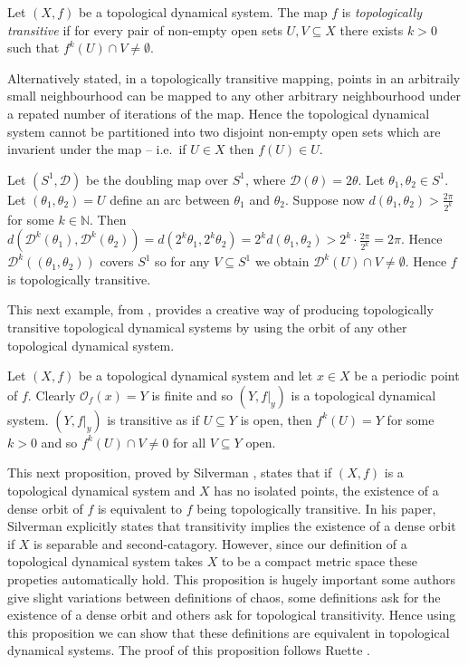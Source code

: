 \begin{defn} \label{defn:topological-transitivity}
    Let $(X, f)$ be a topological dynamical system. The map $f$ is \emph{topologically transitive} if for every pair of non-empty open sets $U, V \subseteq X$ there exists $k > 0$ such that $f^k(U) \cap V \neq \emptyset$.
\end{defn}

Alternatively stated, in a topologically transitive mapping, points in an arbitraily small neighbourhood can be mapped to any other arbitrary neighbourhood under a repated number of iterations of the map. Hence the topological dynamical system cannot be partitioned into two disjoint non-empty open sets which are invarient under the map -- i.e.\ if $U \in X$ then $f(U) \in U$.

\begin{exmp}
    Let $(S^1, \mathcal{D})$ be the doubling map over $S^1$, where $\mathcal{D}(\theta) = 2\theta$. Let $\theta_1, \theta_2 \in S^1$. Let $(\theta_1, \theta_2) = U$ define an arc between $\theta_1$ and $\theta_2$. Suppose now $d\left(\theta_1, \theta_2\right) > \frac{2\pi}{2^k}$ for some $k \in \mathbb{N}$. Then $d\left(\mathcal{D}^k(\theta_1), \mathcal{D}^k(\theta_2)\right) = d\left( 2^k\theta_1, 2^k\theta_2 \right) = 2^k d\left( \theta_1, \theta_2 \right) > 2^k \cdot \frac{2\pi}{2^k} = 2\pi$. Hence $\mathcal{D}^k((\theta_1, \theta_2))$ covers $S^1$ so for any $V \subseteq S^1$ we obtain $\mathcal{D}^k(U) \cap V \neq \emptyset$. Hence $f$ is topologically transitive.
\end{exmp}

This next example, from \cite{kolyada-snoha}, provides a creative way of producing topologically transitive topological dynamical systems by using the orbit of any other topological dynamical system.

\begin{exmp}
    Let $(X, f)$ be a topological dynamical system and let $x \in X$ be a periodic point of $f$. Clearly $\mathcal{O}_f(x) = Y$ is finite and so $(Y, f|_y)$ is a topological dynamical system. $(Y, f|_y)$ is transitive as if $U \subseteq Y$ is open, then $f^k(U) = Y$ for some $k > 0$ and so $f^k(U) \cap V \neq 0$ for all $V \subseteq Y$ open.
\end{exmp}

This next proposition, proved by Silverman \cite{silverman}, states that if $(X, f)$ is a topological dynamical system and $X$ has no isolated points, the existence of a dense orbit of $f$ is equivalent to $f$ being topologically transitive. In his paper, Silverman explicitly states that transitivity implies the existence of a dense orbit if $X$ is separable and second-catagory. However, since our definition of a topological dynamical system takes $X$ to be a compact metric space these propeties automatically hold. This proposition is hugely important some authors give slight variations between definitions of chaos, some definitions ask for the existence of a dense orbit and others ask for topological transitivity. Hence using this proposition we can show that these definitions are equivalent in topological dynamical systems. The proof of this proposition follows Ruette \cite[\S 2.1]{ruette}.

